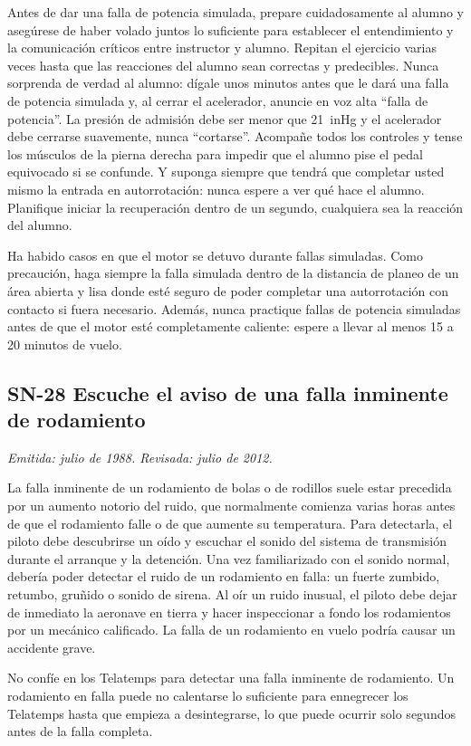 Antes de dar una falla de potencia simulada, prepare cuidadosamente al alumno y asegúrese de haber volado juntos lo suficiente para establecer el entendimiento y la comunicación críticos entre instructor y alumno. Repitan el ejercicio varias veces hasta que las reacciones del alumno sean correctas y predecibles. Nunca sorprenda de verdad al alumno: dígale unos minutos antes que le dará una falla de potencia simulada y, al cerrar el acelerador, anuncie en voz alta ``falla de potencia''. La presión de admisión debe ser menor que 21~inHg y el acelerador debe cerrarse suavemente, nunca ``cortarse''. Acompañe todos los controles y tense los músculos de la pierna derecha para impedir que el alumno pise el pedal equivocado si se confunde. Y suponga siempre que tendrá que completar usted mismo la entrada en autorrotación: nunca espere a ver qué hace el alumno. Planifique iniciar la recuperación dentro de un segundo, cualquiera sea la reacción del alumno.

Ha habido casos en que el motor se detuvo durante fallas simuladas. Como precaución, haga siempre la falla simulada dentro de la distancia de planeo de un área abierta y lisa donde esté seguro de poder completar una autorrotación con contacto si fuera necesario. Además, nunca practique fallas de potencia simuladas antes de que el motor esté completamente caliente: espere a llevar al menos 15 a 20 minutos de vuelo.

\subsection*{SN-28 \quad Escuche el aviso de una falla inminente de rodamiento}
{\small\textit{Emitida: julio de 1988. Revisada: julio de 2012.}}

La falla inminente de un rodamiento de bolas o de rodillos suele estar precedida por un aumento notorio del ruido, que normalmente comienza varias horas antes de que el rodamiento falle o de que aumente su temperatura. Para detectarla, el piloto debe descubrirse un oído y escuchar el sonido del sistema de transmisión durante el arranque y la detención. Una vez familiarizado con el sonido normal, debería poder detectar el ruido de un rodamiento en falla: un fuerte zumbido, retumbo, gruñido o sonido de sirena. Al oír un ruido inusual, el piloto debe dejar de inmediato la aeronave en tierra y hacer inspeccionar a fondo los rodamientos por un mecánico calificado. La falla de un rodamiento en vuelo podría causar un accidente grave.

No confíe en los Telatemps para detectar una falla inminente de rodamiento. Un rodamiento en falla puede no calentarse lo suficiente para ennegrecer los Telatemps hasta que empieza a desintegrarse, lo que puede ocurrir solo segundos antes de la falla completa.

